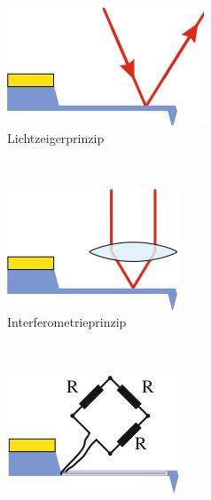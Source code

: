 \begin{figure}[H]
\centering
	\begin{subfigure}[t]{0.24\textwidth}
	\includegraphics[width=\textwidth]{Abb/typ1.png}
  \caption{Lichtzeigerprinzip}
  \label{fig:typ1}
	\end{subfigure}
	~
	\begin{subfigure}[t]{0.22\textwidth}
	\includegraphics[width=\textwidth]{Abb/typ2.png}
  \caption{Interferometrieprinzip}
  \label{fig:typ2}
	\end{subfigure}
  ~
  \begin{subfigure}[t]{0.22\textwidth}
  \includegraphics[width=\textwidth]{Abb/typ3.png}

\end{subfigure}
\end{figure}

